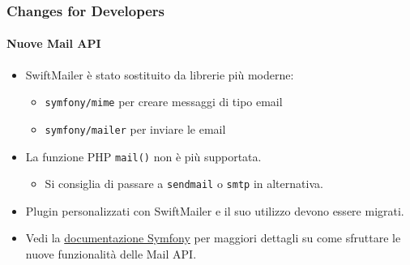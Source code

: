 
\begin{frame}[fragile]
	\frametitle{Changes for Developers}
	\framesubtitle{Nuove Mail API}

	\begin{itemize}
		\item SwiftMailer è stato sostituito da librerie più moderne:

			\begin{itemize}
				\item \texttt{symfony/mime} per creare messaggi di tipo email
				\item \texttt{symfony/mailer} per inviare le email
			\end{itemize}

		\item La funzione PHP \texttt{mail()} non è più supportata.

			\begin{itemize}\smaller
				\item[\ding{228}] Si consiglia di passare a \texttt{sendmail} o \texttt{smtp} in alternativa.
			\end{itemize}\normalsize

		\item Plugin personalizzati con SwiftMailer e il suo utilizzo devono essere migrati.

		\item Vedi la \href{https://symfony.com/doc/current/mailer.html}{documentazione Symfony}
			per maggiori dettagli su come sfruttare le nuove funzionalità delle Mail API.
	\end{itemize}

\end{frame}



